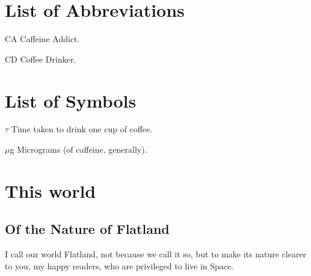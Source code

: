 \documentclass[edeposit,fullpage]{uiucthesis2014}
\begin{document}

\tableofcontents
\listoftables
\listoffigures

\chapter{List of Abbreviations}

\begin{symbollist*}
\item[CA] Caffeine Addict.
\item[CD] Coffee Drinker.
\end{symbollist*}

\chapter{List of Symbols}

\begin{symbollist}[0.7in]
\item[$\tau$] Time taken to drink one cup of coffee.
\item[$\mu$g] Micrograms (of caffeine, generally).
\end{symbollist}

\mainmatter
\chapter{This world}
\section{Of the Nature of Flatland}

I call our world Flatland, not because we call it so, but to make its
nature clearer to you, my happy readers, who are privileged to live in
Space.
\end{document}
